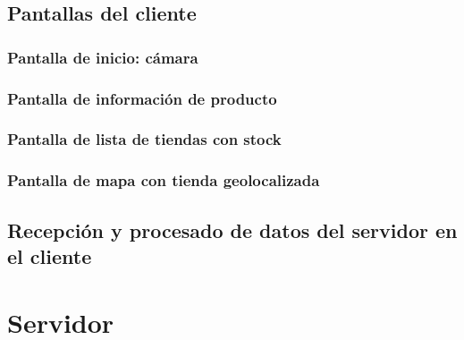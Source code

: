 \subsection{Pantallas del cliente}

\subsubsection{Pantalla de inicio: cámara}

\subsubsection{Pantalla de información de producto}

\subsubsection{Pantalla de lista de tiendas con stock}

\subsubsection{Pantalla de mapa con tienda geolocalizada}

\subsection{Recepción y procesado de datos del servidor en el cliente}

\section{Servidor}

\chapterend